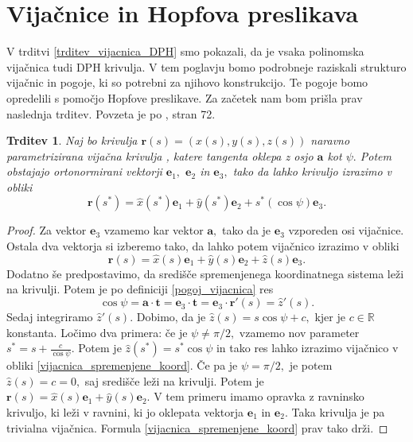 \documentclass[12pt,a4paper,twoside]{article}
\theoremstyle{definition} %
\theoremstyle{plain} %
\newtheorem{trditev}[definicija]{Trditev}
\numberwithin{equation}{section}  %
\newcommand{\R}{\mathbb R}
\newcommand{\tV}{\mathbf{t}}
\newcommand{\aV}{\mathbf{a}}
\newcommand{\eV}{\mathbf{e}}
\newcommand{\rV}{\mathbf{r}}
\begin{document}

\section{Vijačnice in Hopfova preslikava}

V trditvi \ref{trditev_vijacnica_DPH} smo pokazali, da je vsaka polinomska vijačnica tudi DPH krivulja. V tem poglavju bomo podrobneje raziskali strukturo vijačnic in pogoje, ki so potrebni za njihovo konstrukcijo. Te pogoje bomo opredelili s pomočjo Hopfove preslikave. Za začetek nam bom prišla prav naslednja trditev. Povzeta je po \cite{lipschutz1969schaum}, stran 72.
\begin{trditev}
	Naj bo krivulja $\rV(s)=(x(s),y(s),z(s))$ naravno parametrizirana vijačna krivulja , katere tangenta oklepa z osjo $\aV$ kot $\psi.$ Potem obstajajo ortonormirani vektorji $\eV_1,$ $\eV_2$ in $\eV_3,$ tako da lahko krivuljo izrazimo v obliki
	\begin{equation}
		\label{vijacnica_spremenjene_koord}
		\rV(s^*)=\hat{x}(s^*)\eV_1+\hat{y}(s^*)\eV_2+s^*(\cos\psi)\eV_3.
	\end{equation}
\end{trditev}
\begin{proof}
	Za vektor $\eV_3$ vzamemo kar vektor $\aV,$ tako da je $\eV_3$ vzporeden osi vijačnice. Ostala dva vektorja si izberemo tako, da lahko potem vijačnico izrazimo v obliki
	\begin{equation*}
		\rV(s)=\hat{x}(s)\eV_1+\hat{y}(s)\eV_2+\hat{z}(s)\eV_3.
	\end{equation*}
	Dodatno še predpostavimo, da središče spremenjenega koordinatnega sistema leži na krivulji. Potem je po definiciji \eqref{pogoj_vijacnica} res
	\begin{equation*}
		\cos\psi=\aV\cdot\tV=\eV_3\cdot\tV=\eV_3\cdot\rV'(s)=\hat{z}'(s).
	\end{equation*}
	Sedaj integriramo $\hat{z}'(s).$ Dobimo, da je $\hat{z}(s)=s\cos\psi+c,$ kjer je $c\in\R$ konstanta. Ločimo dva primera: če je $\psi\neq \pi/2,$ vzamemo nov parameter $s^*=s+\frac{c}{\cos\psi}.$ Potem je $\hat{z}(s^*)=s^*\cos\psi$ in tako res lahko izrazimo vijačnico v obliki \eqref{vijacnica_spremenjene_koord}. Če pa je $\psi=\pi/2,$ je potem $\hat{z}(s)=c=0,$ saj središče leži na krivulji. Potem je $\rV(s)=\hat{x}(s)\eV_1+\hat{y}(s)\eV_2.$ V tem primeru imamo opravka z ravninsko krivuljo, ki leži v ravnini, ki jo oklepata vektorja $\eV_1$ in $\eV_2.$ Taka krivulja je pa trivialna vijačnica. Formula \eqref{vijacnica_spremenjene_koord} prav tako drži.
\end{proof}
\end{document}
